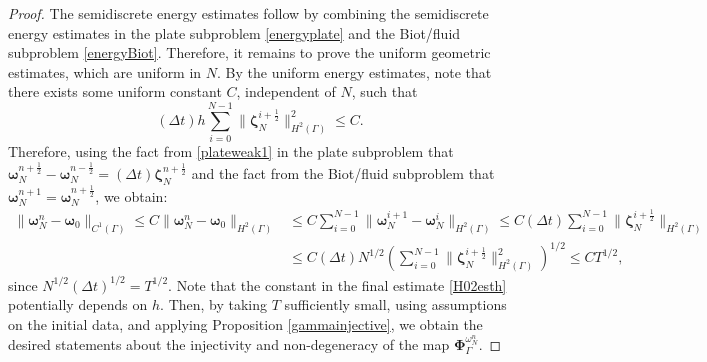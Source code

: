 \documentclass[11pt]{article}
\newcommand{\bd}{\boldsymbol}
\theoremstyle{definition}
\begin{document}
\begin{proof}
The semidiscrete energy estimates follow by combining the semidiscrete energy estimates in the plate subproblem \eqref{energyplate} and the Biot/fluid subproblem \eqref{energyBiot}. Therefore, it remains to prove the uniform geometric estimates, which are uniform in $N$. By the uniform energy estimates, note that there exists some uniform constant $C$, independent of $N$, such that
\begin{equation}\label{esth}
(\Delta t) h \sum_{i = 0}^{N - 1} \|\bd{\zeta}^{i + \frac{1}{2}}_{N}\|^{2}_{H^{2}(\Gamma)} \le C.
\end{equation}
Therefore, using the fact from \eqref{plateweak1} in the plate subproblem that $\bd{\omega}^{n + \frac{1}{2}}_{N} - \bd{\omega}^{n - \frac{1}{2}}_{N} = (\Delta t) \bd{\zeta}^{n + \frac{1}{2}}_{N}$ and the fact from the Biot/fluid subproblem that $\bd{\omega}^{n + 1}_{N} = \bd{\omega}^{n + \frac{1}{2}}_{N}$, we obtain:
\begin{align}\label{H02esth}
\|\bd{\omega}^{n}_{N} - \bd{\omega}_{0}\|_{C^{1}(\Gamma)} \le C\|\bd{\omega}^{n}_{N} - \bd{\omega}_{0}\|_{H^{2}(\Gamma)} &\le C\sum_{i = 0}^{N - 1} \|\bd{\omega}^{i + 1}_{N} - \bd{\omega}^{i}_{N}\|_{H^{2}(\Gamma)} \le C(\Delta t) \sum_{i = 0}^{N - 1} \|\bd{\zeta}^{i + \frac{1}{2}}_{N}\|_{H^{2}(\Gamma)} \nonumber \\
&\le C(\Delta t) N^{1/2} \left(\sum_{i = 0}^{N - 1} \|\bd{\zeta}^{i + \frac{1}{2}}_{N}\|_{H^{2}(\Gamma)}^{2}\right)^{1/2} \le CT^{1/2},
\end{align}
since $N^{1/2}(\Delta t)^{1/2} = T^{1/2}$. Note that the constant in the final estimate \eqref{H02esth} potentially depends on $h$. Then, by taking $T$ sufficiently small, using assumptions on the initial data, and applying Proposition \ref{gammainjective}, we obtain the desired statements about the injectivity and non-degeneracy of the map $\bd{\Phi}^{\omega^{n}_{N}}_{\Gamma}$. 


\end{proof}
\end{document}

